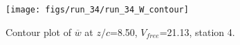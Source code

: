 \begin{figure}[H]
\centering
\texttt{[image: figs/run\_34/run\_34\_W\_contour]}
\caption{Contour plot of $\overline{w}$ at $z/c$=8.50, $V_{free}$=21.13, station 4.}
\label{fig:run_34_W_contour}
\end{figure}


